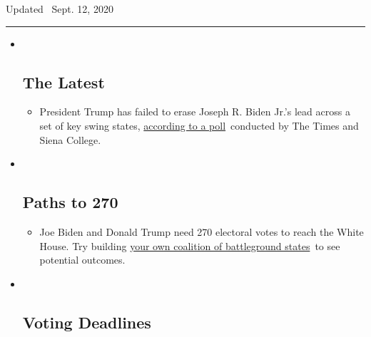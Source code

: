 Updated ~Sept. 12, 2020

\begin{center}\rule{0.5\linewidth}{\linethickness}\end{center}

\begin{itemize}
\item ~
  \hypertarget{the-latest}{%
  \subsection{The Latest}\label{the-latest}}

  \begin{itemize}
  \item
    President Trump has failed to erase Joseph R. Biden Jr.'s lead
    across a set of key swing states,
    \href{https://www.nytimes3xbfgragh.onion/2020/09/12/us/politics/biden-trump-poll-wisconsin-minnesota.html?action=click\&pgtype=Article\&state=default\&region=BELOW_MAIN_CONTENT\&context=storylines_guide}{according
    to a poll}~conducted by The Times and Siena College.
  \end{itemize}
\item ~
  \hypertarget{paths-to-270}{%
  \subsection{Paths to 270}\label{paths-to-270}}

  \begin{itemize}
  \item
    Joe Biden and Donald Trump need 270 electoral votes to reach the
    White House. Try building
    \href{https://www.nytimes3xbfgragh.onion/interactive/2020/us/elections/election-states-biden-trump.html?action=click\&pgtype=Article\&state=default\&region=BELOW_MAIN_CONTENT\&context=storylines_guide}{your
    own coalition of battleground states}~to see potential outcomes.
  \end{itemize}
\item ~
  \hypertarget{voting-deadlines}{%
  \subsection{Voting Deadlines}\label{voting-deadlines}}


\end{itemize}
